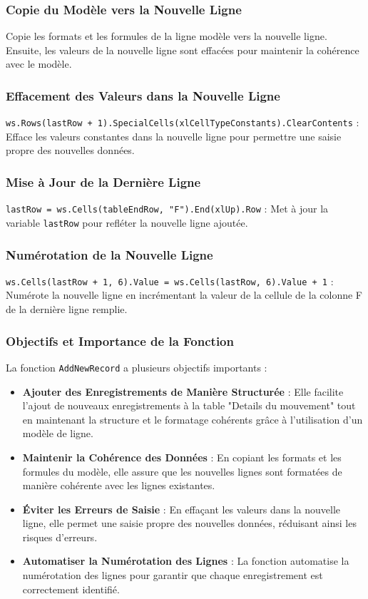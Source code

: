 \documentclass[a4paper, oneside, 12pt, final]{extreport}
\begin{document}
\subsubsection{Copie du Modèle vers la Nouvelle Ligne}

Copie les formats et les formules de la ligne modèle vers la nouvelle ligne. Ensuite, les valeurs de la nouvelle ligne sont effacées pour maintenir la cohérence avec le modèle.

\subsubsection{Effacement des Valeurs dans la Nouvelle Ligne}

\texttt{ws.Rows(lastRow + 1).SpecialCells(xlCellTypeConstants).ClearContents} : Efface les valeurs constantes dans la nouvelle ligne pour permettre une saisie propre des nouvelles données.

\subsubsection{Mise à Jour de la Dernière Ligne}

\texttt{lastRow = ws.Cells(tableEndRow, "F").End(xlUp).Row} : Met à jour la variable \texttt{lastRow} pour refléter la nouvelle ligne ajoutée.

\subsubsection{Numérotation de la Nouvelle Ligne}

\texttt{ws.Cells(lastRow + 1, 6).Value = ws.Cells(lastRow, 6).Value + 1} : Numérote la nouvelle ligne en incrémentant la valeur de la cellule de la colonne F de la dernière ligne remplie.

\subsubsection{Objectifs et Importance de la Fonction}

La fonction \texttt{AddNewRecord} a plusieurs objectifs importants :

\begin{itemize}
    \item \textbf{Ajouter des Enregistrements de Manière Structurée} : Elle facilite l'ajout de nouveaux enregistrements à la table "Details du mouvement" tout en maintenant la structure et le formatage cohérents grâce à l'utilisation d'un modèle de ligne.
    \item \textbf{Maintenir la Cohérence des Données} : En copiant les formats et les formules du modèle, elle assure que les nouvelles lignes sont formatées de manière cohérente avec les lignes existantes.
    \item \textbf{Éviter les Erreurs de Saisie} : En effaçant les valeurs dans la nouvelle ligne, elle permet une saisie propre des nouvelles données, réduisant ainsi les risques d'erreurs.
    \item \textbf{Automatiser la Numérotation des Lignes} : La fonction automatise la numérotation des lignes pour garantir que chaque enregistrement est correctement identifié.
\end{itemize}
\end{document}
